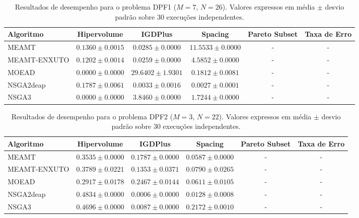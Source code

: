 \begin{table}[htpb]
\centering
\caption{Resultados de desempenho para o problema DPF1 ($M=7$, $N=26$). Valores expressos em média $\pm$ desvio padrão sobre 30 execuções independentes.}
\label{tab:DPF1_M7_N26}
\begin{tabular}{lccccc}
\hline\hline
Algoritmo & Hipervolume & IGDPlus & Spacing & Pareto Subset & Taxa de Erro \\
\hline
MEAMT & $0.1360 \pm 0.0015$ & $0.0285 \pm 0.0000$ & $11.5533 \pm 0.0000$ & - & - \\
MEAMT-ENXUTO & $0.1202 \pm 0.0014$ & $0.0259 \pm 0.0000$ & $4.5852 \pm 0.0000$ & - & - \\
MOEAD & $0.0000 \pm 0.0000$ & $29.6402 \pm 1.9301$ & $0.1812 \pm 0.0081$ & - & - \\
NSGA2deap & $0.1787 \pm 0.0061$ & $0.0033 \pm 0.0016$ & $0.0027 \pm 0.0001$ & - & - \\
NSGA3 & $0.0000 \pm 0.0000$ & $3.8460 \pm 0.0000$ & $1.7244 \pm 0.0000$ & - & - \\
\hline\hline
\end{tabular}
\end{table}

\begin{table}[htpb]
\centering
\caption{Resultados de desempenho para o problema DPF2 ($M=3$, $N=22$). Valores expressos em média $\pm$ desvio padrão sobre 30 execuções independentes.}
\label{tab:DPF2_M3_N22}
\begin{tabular}{lccccc}
\hline\hline
Algoritmo & Hipervolume & IGDPlus & Spacing & Pareto Subset & Taxa de Erro \\
\hline
MEAMT & $0.3535 \pm 0.0000$ & $0.1787 \pm 0.0000$ & $0.0587 \pm 0.0000$ & - & - \\
MEAMT-ENXUTO & $0.3789 \pm 0.0221$ & $0.1353 \pm 0.0371$ & $0.0790 \pm 0.0265$ & - & - \\
MOEAD & $0.2917 \pm 0.0178$ & $0.2467 \pm 0.0144$ & $0.0611 \pm 0.0105$ & - & - \\
NSGA2deap & $0.4834 \pm 0.0000$ & $0.0006 \pm 0.0000$ & $0.0128 \pm 0.0008$ & - & - \\
NSGA3 & $0.4696 \pm 0.0000$ & $0.0087 \pm 0.0000$ & $0.2172 \pm 0.0010$ & - & - \\
\hline\hline
\end{tabular}
\end{table}

